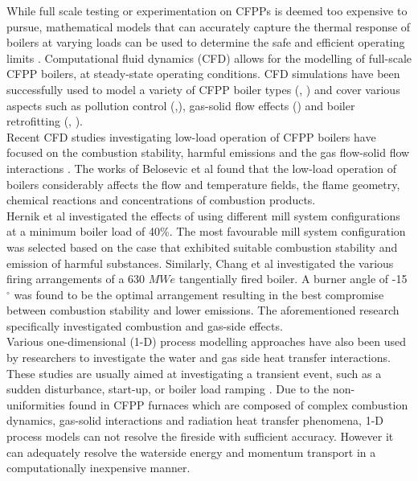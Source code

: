 \documentclass[review]{elsarticle}
\begin{document}
While full scale testing or experimentation on CFPPs is deemed too expensive to pursue, mathematical models that can accurately capture the thermal response of boilers at varying loads can be used to determine the safe and efficient operating limits \cite{Laubscher2019b}. Computational fluid dynamics (CFD) allows for the modelling of full-scale CFPP boilers, at steady-state operating conditions. CFD simulations have been successfully used to model a variety of CFPP boiler types (\cite{Laubscher2019a}, \cite{Gu2020}) and cover various aspects such as pollution control (\cite{Du2017},\cite{Fan2001}), gas-solid flow effects (\cite{Chen2017}) and boiler retrofitting (\citep{Gu2020}, \cite{He2007}).\\

Recent CFD studies investigating low-load operation of CFPP boilers have focused on the combustion stability, harmful emissions and the gas flow-solid flow interactions \cite{Jiang2021}. The works of Belosevic et al \citep{Belosevic2019a} found that the low-load operation of boilers considerably affects the flow and temperature fields, the flame geometry, chemical reactions and concentrations of combustion products.\\

Hernik et al \cite{Hernik2020} investigated the effects of using different mill system configurations at a minimum boiler load of 40\%. The most favourable mill system configuration was selected based on the case that exhibited suitable combustion stability and emission of harmful substances. Similarly, Chang et al \citep{Chang2021} investigated the various firing arrangements of a 630 $MWe$ tangentially fired boiler. A burner angle of -15 $^\circ$ was found to be the optimal arrangement resulting in the best compromise between combustion stability and lower emissions. The aforementioned research specifically investigated combustion and gas-side effects.\\

Various one-dimensional (1-D) process modelling approaches have also been used by researchers to investigate the water and gas side heat transfer interactions. These studies are usually aimed at investigating a transient event, such as a sudden disturbance, start-up, or boiler load ramping \cite{Alobaid2017}. Due to the non-uniformities found in CFPP furnaces which are composed of complex combustion dynamics, gas-solid interactions and  radiation heat transfer phenomena, 1-D process models can not resolve the fireside with sufficient accuracy. However it can adequately resolve the waterside energy and momentum transport in a computationally inexpensive manner.\\
\end{document}
